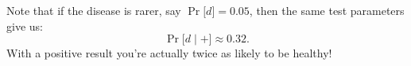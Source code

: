\documentclass[preview, border={0pt 2pt 1pt 1pt}, varwidth=9cm]{standalone} %
\begin{document}
    Note that if the disease is rarer, say \({\Pr}\big[ d \big] = 0.05\),
    then the same test parameters give us:
    \[
        {\Pr}\big[ d \mid + \big] \approx 0.32.
    \]
    With a positive result you're actually twice as likely to be healthy!

    















\end{document}
